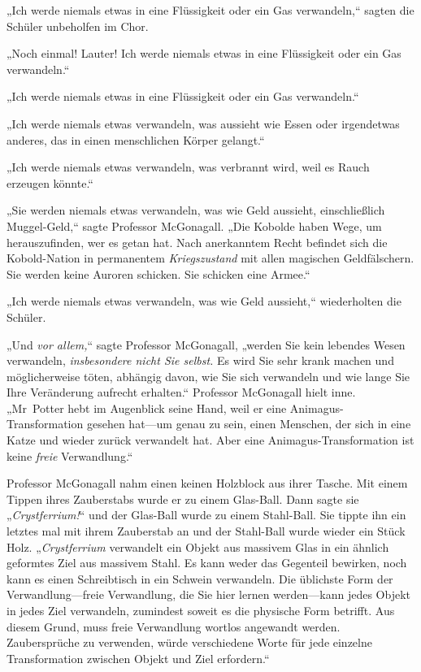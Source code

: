 {„Ich werde niemals etwas in eine Flüssigkeit oder ein Gas verwandeln,“ sagten die Schüler unbeholfen im Chor.

„Noch einmal! Lauter! Ich werde niemals etwas in eine Flüssigkeit oder ein Gas verwandeln.“

„Ich werde niemals etwas in eine Flüssigkeit oder ein Gas verwandeln.“

„Ich werde niemals etwas verwandeln, was aussieht wie Essen oder irgendetwas anderes, das in einen menschlichen Körper gelangt.“

„Ich werde niemals etwas verwandeln, was verbrannt wird, weil es Rauch erzeugen könnte.“

„Sie werden niemals etwas verwandeln, was wie Geld aussieht, einschließlich Muggel-Geld,“ sagte Professor McGonagall. „Die Kobolde haben Wege, um herauszufinden, wer es getan hat. Nach anerkanntem Recht befindet sich die Kobold-Nation in permanentem \emph{Kriegszustand} mit allen magischen Geldfälschern. Sie werden keine Auroren schicken. Sie schicken eine Armee.“

„Ich werde niemals etwas verwandeln, was wie Geld aussieht,“ wiederholten die Schüler.

„Und \emph{vor allem,}“ sagte Professor McGonagall, „werden Sie kein lebendes Wesen verwandeln, \emph{insbesondere nicht Sie selbst.} Es wird Sie sehr krank machen und möglicherweise töten, abhängig davon, wie Sie sich verwandeln und wie lange Sie Ihre Veränderung aufrecht erhalten.“ Professor McGonagall hielt inne. „Mr~Potter hebt im Augenblick seine Hand, weil er eine Animagus-Transformation gesehen hat—um genau zu sein, einen Menschen, der sich in eine Katze und wieder zurück verwandelt hat. Aber eine Animagus-Transformation ist keine \emph{freie} Verwandlung.“

Professor McGonagall nahm einen keinen Holzblock aus ihrer Tasche. Mit einem Tippen ihres Zauberstabs wurde er zu einem Glas-Ball. Dann sagte sie „\emph{Crystferrium!}“ und der Glas-Ball wurde zu einem Stahl-Ball. Sie tippte ihn ein letztes mal mit ihrem Zauberstab an und der Stahl-Ball wurde wieder ein Stück Holz. „\emph{Crystferrium} verwandelt ein Objekt aus massivem Glas in ein ähnlich geformtes Ziel aus massivem Stahl. Es kann weder das Gegenteil bewirken, noch kann es einen Schreibtisch in ein Schwein verwandeln. Die üblichste Form der Verwandlung—freie Verwandlung, die Sie hier lernen werden—kann jedes Objekt in jedes Ziel verwandeln, zumindest soweit es die physische Form betrifft. Aus diesem Grund, muss freie Verwandlung wortlos angewandt werden. Zaubersprüche zu verwenden, würde verschiedene Worte für jede einzelne Transformation zwischen Objekt und Ziel erfordern.“

}
